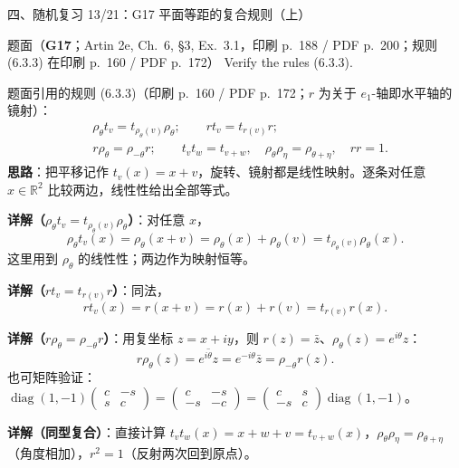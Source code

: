 \documentclass[aspectratio=169,10pt,fontset=none]{ctexbeamer}
\newcommand{\ex}[1]{\textcolor{accent}{\footnotesize\bfseries #1}}
\newcommand{\key}[1]{\textcolor{ink}{\bfseries #1}}
\begin{document}
\begin{frame}[t]{四、随机复习 13/21：G17 平面等距的复合规则（上）}
\label{ex:G17}
\scriptsize
\begin{block}{\footnotesize 题面（\ex{G17}；Artin 2e, Ch.~6, §3, Ex.~3.1，印刷 p.~188 / PDF p.~200；规则 (6.3.3) 在印刷 p.~160 / PDF p.~172）}
Verify the rules (6.3.3).
\end{block}
题面引用的规则 (6.3.3)（印刷 p.~160 / PDF p.~172；$r$ 为关于 $e_1$-轴即水平轴的镜射）：
\[
\begin{aligned}
&\rho_\theta t_v=t_{\rho_\theta(v)}\rho_\theta;\qquad
 r t_v=t_{r(v)}r;\\
&r\rho_\theta=\rho_{-\theta}r;\qquad
t_vt_w=t_{v+w},\quad \rho_\theta\rho_\eta=\rho_{\theta+\eta},\quad rr=1.
\end{aligned}
\]
\key{思路}：把平移记作 $t_v(x)=x+v$，旋转、镜射都是线性映射。逐条对任意 $x\in\mathbb R^2$ 比较两边，线性性给出全部等式。

\key{详解（$\rho_\theta t_v=t_{\rho_\theta(v)}\rho_\theta$）}：对任意 $x$，
\[ \rho_\theta t_v(x)=\rho_\theta(x+v)=\rho_\theta(x)+\rho_\theta(v)=t_{\rho_\theta(v)}\rho_\theta(x) . \]
这里用到 $\rho_\theta$ 的线性性；两边作为映射恒等。

\key{详解（$rt_v=t_{r(v)}r$）}：同法，
\[ rt_v(x)=r(x+v)=r(x)+r(v)=t_{r(v)}r(x) . \]

\key{详解（$r\rho_\theta=\rho_{-\theta}r$）}：用复坐标 $z=x+iy$，则 $r(z)=\bar z$、$\rho_\theta(z)=e^{i\theta}z$：
\[ r\rho_\theta(z)=\overline{e^{i\theta}z}=e^{-i\theta}\bar z=\rho_{-\theta}r(z) . \]
也可矩阵验证：$\operatorname{diag}(1,-1)\begin{pmatrix}c&-s\\ s&c\end{pmatrix}=\begin{pmatrix}c&-s\\ -s&-c\end{pmatrix}=\begin{pmatrix}c&s\\ -s&c\end{pmatrix}\operatorname{diag}(1,-1)$。

\key{详解（同型复合）}：直接计算 $t_vt_w(x)=x+w+v=t_{v+w}(x)$，$\rho_\theta\rho_\eta=\rho_{\theta+\eta}$（角度相加），$r^2=1$（反射两次回到原点）。
\end{frame}
\end{document}

